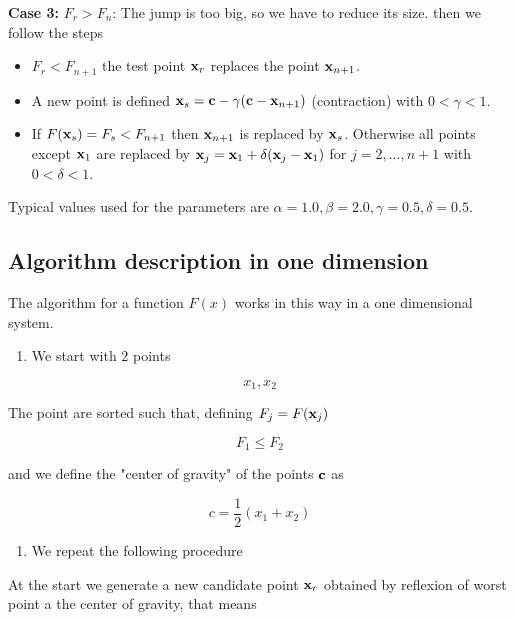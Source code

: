 \documentclass[11pt]{article}
\providecommand{\tightlist}{%
      \setlength{\itemsep}{0pt}\setlength{\parskip}{0pt}}
\begin{document}
\textbf{Case 3:} \(F_r > F_n\): The jump is too big, so we have to
reduce its size. then we follow the steps

\begin{itemize}
\tightlist
\item
  \(F_r < F_{n+1}\) the test point \({\bf x}_r\) replaces the point
  \({\bf x}_{n+1}\).
\item
  A new point is defined
  \({\bf x}_s= {\bf c}-\gamma({\bf c}-{\bf x}_{n+1})\) (contraction)
  with \(0<\gamma<1\).
\item
  If \(F({\bf x}_s) =F_s<F_{n+1}\) then \({\bf x}_{n+1}\) is replaced by
  \({\bf x}_s\). Otherwise all points except \({\bf x}_1\) are replaced
  by \({\bf x}_j={\bf x}_1+\delta ({\bf x}_j-{\bf x}_1)\) for
  \(j=2,...,n+1\) with \(0<\delta<1\).
\end{itemize}

Typical values used for the parameters are
\(\alpha = 1.0, \beta = 2.0, \gamma = 0.5, \delta = 0.5\).

    \subsection{Algorithm description in one
dimension}\label{algorithm-description-in-one-dimension}

    The algorithm for a function \(F(x)\) works in this way in a one
dimensional system.

\begin{enumerate}
\def\labelenumi{\arabic{enumi}.}
\tightlist
\item
  We start with \(2\) points
\end{enumerate}

\[
x_1, x_2
\]

The point are sorted such that, defining \(F_j = F({\bf x}_j)\)

\[
F_1 \leq F_2 
\]

and we define the "center of gravity" of the points \({\bf c}\) as

\[
c=\frac{1}{2} (x_1+x_2)
\]

\begin{enumerate}
\def\labelenumi{\arabic{enumi}.}
\setcounter{enumi}{1}
\tightlist
\item
  We repeat the following procedure
\end{enumerate}

At the start we generate a new candidate point \({\bf x}_r\) obtained by
reflexion of worst point a the center of gravity, that means
\end{document}
